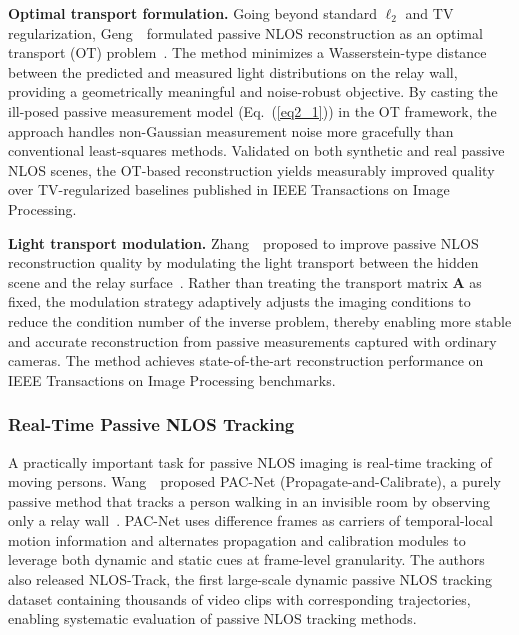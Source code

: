 \vspace{0.8em}
\noindent\textbf{Optimal transport formulation.}
Going beyond standard $\ell_2$ and TV regularization, Geng~\etal~formulated passive NLOS reconstruction as an optimal transport (OT) problem~\cite{geng2022passive}. The method minimizes a Wasserstein-type distance between the predicted and measured light distributions on the relay wall, providing a geometrically meaningful and noise-robust objective. By casting the ill-posed passive measurement model (Eq.~(\ref{eq2_1})) in the OT framework, the approach handles non-Gaussian measurement noise more gracefully than conventional least-squares methods. Validated on both synthetic and real passive NLOS scenes, the OT-based reconstruction yields measurably improved quality over TV-regularized baselines published in IEEE Transactions on Image Processing.

\vspace{0.8em}
\noindent\textbf{Light transport modulation.}
Zhang~\etal~proposed to improve passive NLOS reconstruction quality by modulating the light transport between the hidden scene and the relay surface~\cite{zhang2025passive}. Rather than treating the transport matrix $\mathbf{A}$ as fixed, the modulation strategy adaptively adjusts the imaging conditions to reduce the condition number of the inverse problem, thereby enabling more stable and accurate reconstruction from passive measurements captured with ordinary cameras. The method achieves state-of-the-art reconstruction performance on IEEE Transactions on Image Processing benchmarks.

\subsubsection{Real-Time Passive NLOS Tracking}
A practically important task for passive NLOS imaging is real-time tracking of moving persons. Wang~\etal~proposed PAC-Net (Propagate-and-Calibrate), a purely passive method that tracks a person walking in an invisible room by observing only a relay wall~\cite{wangPropagateCalibrate2023}. PAC-Net uses difference frames as carriers of temporal-local motion information and alternates propagation and calibration modules to leverage both dynamic and static cues at frame-level granularity. The authors also released NLOS-Track, the first large-scale dynamic passive NLOS tracking dataset containing thousands of video clips with corresponding trajectories, enabling systematic evaluation of passive NLOS tracking methods.

